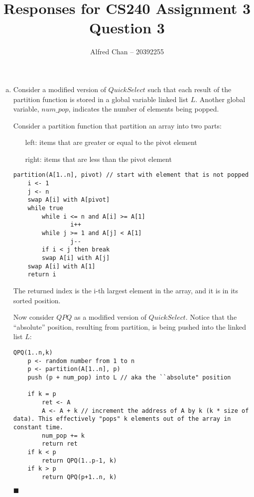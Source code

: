 \documentclass[12pt]{article}
\title{Responses for CS240 Assignment 3 Question 3}
\author{Alfred Chan -- 20392255}
\begin{document}

\maketitle
\begin{enumerate}[(a)]
\item Consider a modified version of $QuickSelect$ such that each result of the partition function is stored in a global variable linked list $L$. 
Another global variable, $num\_pop$, indicates the number of elements being popped.

Consider a partition function that partition an array into two parts:
\begin{itemize}
\item[left:] items that are greater or equal to the pivot element
\item[right:] items that are less than the pivot element
\end{itemize}
\begin{lstlisting}
partition(A[1..n], pivot) // start with element that is not popped
	i <- 1
	j <- n
	swap A[i] with A[pivot]
	while true
		while i <= n and A[i] >= A[1]
				i++
		while j >= 1 and A[j] < A[1]
				j--
		if i < j then break
		swap A[i] with A[j]
	swap A[i] with A[1]
	return i
\end{lstlisting}
The returned index is the i-th largest element in the array, and it is in its sorted position.

Now consider $QPQ$ as a modified version of $QuickSelect$.
Notice that the ``absolute'' position, resulting from partition, is being pushed into the linked list $L$:

\begin{lstlisting}
QPQ(1..n,k)
	p <- random number from 1 to n
	p <- partition(A[1..n], p)
	push (p + num_pop) into L // aka the ``absolute" position
	
	if k = p
		ret <- A
		A <- A + k // increment the address of A by k (k * size of data). This effectively "pops" k elements out of the array in constant time.
		num_pop += k
		return ret
	if k < p
		return QPQ(1..p-1, k)
	if k > p
		return QPQ(p+1..n, k)
\end{lstlisting}
\hfill $\blacksquare$


\end{enumerate}
\end{document}
